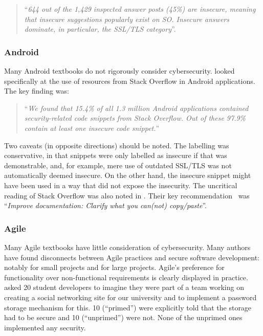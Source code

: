 \documentclass[sigconf]{acmart}
\begin{document}
\begin{quote}
	``{\emph{644 out of the 1,429 inspected answer posts
			(45\%) are insecure, meaning that insecure suggestions
			popularly exist on SO. Insecure answers dominate, in
			particular, the SSL/TLS category}}''.
\end{quote} 

\subsubsection{Android}\label{sec:Android}
Many Android textbooks do not rigorously consider cybersecurity. \cite{Fischeretal2017a} looked specifically at the use of resources from Stack Overflow in Android applications. The key finding was:

\begin{quote}
	``{\emph{We found that 15.4\% of all 1.3 million Android applications
			contained security-related code snippets from
			Stack Overflow. Out of these 97.9\% contain at least one
			insecure code snippet.}}''
\end{quote}

Two caveats (in opposite directions) should be noted. The labelling was conservative, in that snippets were only labelled as insecure if that was demonstrable, and, for example, mere use of outdated SSL/TLS was not automatically deemed insecure. On the other hand, the insecure snippet might have been used in a way that did not expose the insecurity. The uncritical reading of Stack Overflow was also noted in \cite[Slide 29]{Votipkaetal2019a}. Their key recommendation~\cite[Slide 32]{Votipkaetal2019a} was ``{\emph{Improve documentation: Clarify what you can(not) copy/paste}}''. 

\subsubsection{Agile}
Many Agile textbooks have little consideration of cybersecurity. Many authors have found disconnects between Agile practices and secure software development: notably \cite{Bartsch2011a} for small projects and \cite{vanderHeijden:2018:EPS:3239235.3267426} for large projects. Agile's preference for functionality over non-functional requirements is clearly displayed in practice. \cite{Naiakshinaetal2017a} asked 20 student developers to imagine they were part of a team working on creating a social networking site for our university and to implement a password storage mechanism for this. 10 (``primed'') were explicitly told that the storage had to be secure and 10 (``unprimed'') were not. None of the unprimed ones implemented any security. 
\end{document}
